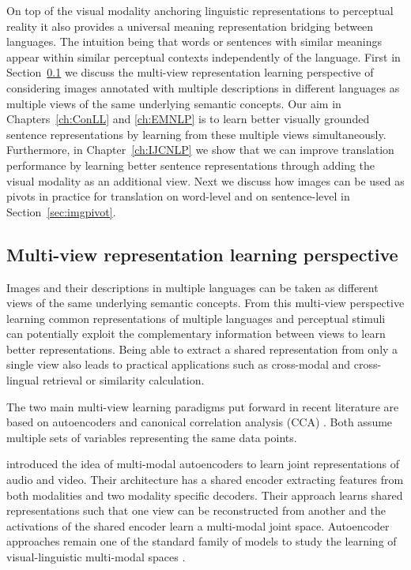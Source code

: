 On top of the visual modality anchoring linguistic representations to perceptual reality it
also provides a universal meaning representation bridging between languages.
The  intuition being that words or sentences with similar meanings appear
within similar perceptual contexts independently of the language.
First in Section~\ref{sec:multiview} we discuss
the multi-view representation learning perspective of considering images annotated
with multiple descriptions in different languages as multiple views of the
same underlying semantic concepts.
Our aim in Chapters~\ref{ch:ConLL} and \ref{ch:EMNLP} is to learn
better visually grounded sentence representations by learning from these multiple views
simultaneously. Furthermore, in Chapter~\ref{ch:IJCNLP} we show that we can improve
translation performance by learning better sentence representations through  adding the visual
modality as an additional view.
Next we discuss how images can be used as pivots in practice for translation on word-level 
and on sentence-level in Section~\ref{sec:imgpivot}.

\subsection{Multi-view representation learning perspective}
\label{sec:multiview}


Images and their descriptions in multiple languages can be taken as different views of the
same underlying semantic concepts. From this multi-view perspective learning common representations
of multiple languages and perceptual stimuli can potentially exploit the complementary information
between views to learn better representations. Being able to extract
a shared representation from only a single view also leads to practical applications such as
cross-modal and cross-lingual retrieval or similarity calculation.


The two main multi-view learning paradigms put forward in recent literature are based on
autoencoders and canonical correlation analysis (CCA) \citep{wang2015deep}. Both assume
multiple sets of variables representing the same data points.

\cite{ngiam2011multimodal} introduced the idea
of multi-modal autoencoders to learn joint representations of audio and video. Their
architecture has a shared encoder extracting features from both modalities and two
modality specific decoders.  
Their approach learns shared representations such that one view can be reconstructed from another and
the activations of the shared encoder learn a multi-modal joint space.
Autoencoder approaches  remain one of the standard family of models
to study the learning of visual-linguistic multi-modal spaces \citep{silberer2014learning,silberer2017visually,wang2018associative}.

